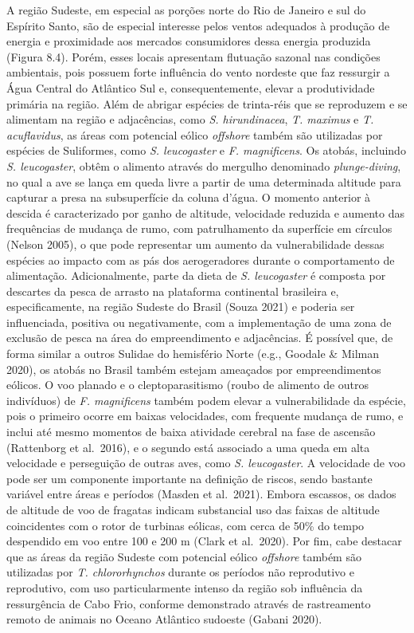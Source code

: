 \documentclass[
  oneside]{scrbook}
\begin{document}
A região Sudeste, em especial as porções norte do Rio de Janeiro e sul do Espírito Santo, são de especial interesse pelos ventos adequados à produção de energia e proximidade aos mercados consumidores dessa energia produzida (Figura 8.4). Porém, esses locais apresentam flutuação sazonal nas condições ambientais, pois possuem forte influência do vento nordeste que faz ressurgir a Água Central do Atlântico Sul e, consequentemente, elevar a produtividade primária na região. Além de abrigar espécies de trinta-réis que se reproduzem e se alimentam na região e adjacências, como \emph{S. hirundinacea}, \emph{T. maximus} e \emph{T. acuflavidus}, as áreas com potencial eólico \emph{offshore} também são utilizadas por espécies de Suliformes, como \emph{S. leucogaster} e \emph{F. magnificens}. Os atobás, incluindo \emph{S. leucogaster}, obtêm o alimento através do mergulho denominado \emph{plunge-diving}, no qual a ave se lança em queda livre a partir de uma determinada altitude para capturar a presa na subsuperfície da coluna d'água. O momento anterior à descida é caracterizado por ganho de altitude, velocidade reduzida e aumento das frequências de mudança de rumo, com patrulhamento da superfície em círculos (Nelson 2005), o que pode representar um aumento da vulnerabilidade dessas espécies ao impacto com as pás dos aerogeradores durante o comportamento de alimentação. Adicionalmente, parte da dieta de \emph{S. leucogaster} é composta por descartes da pesca de arrasto na plataforma continental brasileira e, especificamente, na região Sudeste do Brasil (Souza 2021) e poderia ser influenciada, positiva ou negativamente, com a implementação de uma zona de exclusão de pesca na área do empreendimento e adjacências. É possível que, de forma similar a outros Sulidae do hemisfério Norte (e.g., Goodale \& Milman 2020), os atobás no Brasil também estejam ameaçados por empreendimentos eólicos. O voo planado e o cleptoparasitismo (roubo de alimento de outros indivíduos) de \emph{F. magnificens} também podem elevar a vulnerabilidade da espécie, pois o primeiro ocorre em baixas velocidades, com frequente mudança de rumo, e inclui até mesmo momentos de baixa atividade cerebral na fase de ascensão (Rattenborg et al.~2016), e o segundo está associado a uma queda em alta velocidade e perseguição de outras aves, como \emph{S. leucogaster}. A velocidade de voo pode ser um componente importante na definição de riscos, sendo bastante variável entre áreas e períodos (Masden et al.~2021). Embora escassos, os dados de altitude de voo de fragatas indicam substancial uso das faixas de altitude coincidentes com o rotor de turbinas eólicas, com cerca de 50\% do tempo despendido em voo entre 100 e 200 m (Clark et al.~2020). Por fim, cabe destacar que as áreas da região Sudeste com potencial eólico \emph{offshore} também são utilizadas por \emph{T. chlororhynchos} durante os períodos não reprodutivo e reprodutivo, com uso particularmente intenso da região sob influência da ressurgência de Cabo Frio, conforme demonstrado através de rastreamento remoto de animais no Oceano Atlântico sudoeste (Gabani 2020).
\end{document}
